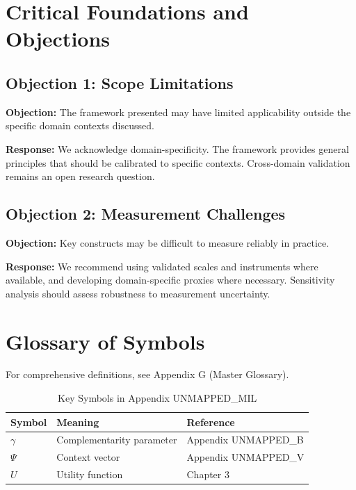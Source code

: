 


\section{Critical Foundations and Objections}
\label{sec:mil-foundations}

\subsection{Objection 1: Scope Limitations}

\textbf{Objection:} The framework presented may have limited applicability
outside the specific domain contexts discussed.

\textbf{Response:} We acknowledge domain-specificity. The framework provides
general principles that should be calibrated to specific contexts. Cross-domain
validation remains an open research question.

\subsection{Objection 2: Measurement Challenges}

\textbf{Objection:} Key constructs may be difficult to measure reliably in
practice.

\textbf{Response:} We recommend using validated scales and instruments where
available, and developing domain-specific proxies where necessary. Sensitivity
analysis should assess robustness to measurement uncertainty.



\section{Glossary of Symbols}
\label{sec:mil-glossary}

For comprehensive definitions, see Appendix G (Master Glossary).

\begin{table}[htbp]
\centering
\caption{Key Symbols in Appendix UNMAPPED_MIL}
\begin{tabular}{lll}
\toprule
\textbf{Symbol} & \textbf{Meaning} & \textbf{Reference} \\
\midrule
$\gamma$ & Complementarity parameter & Appendix UNMAPPED_B \\
$\Psi$ & Context vector & Appendix UNMAPPED_V \\
$U$ & Utility function & Chapter 3 \\
\bottomrule
\end{tabular}
\end{table}


